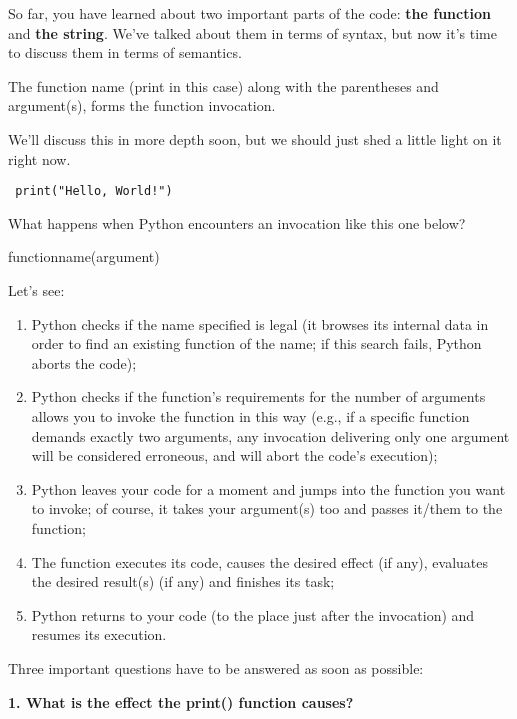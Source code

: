 \documentclass[a4paper,10pt]{article}
\begin{document}
So far, you have learned about two important parts of the code: \textbf{the function} and \textbf{the string}. We've talked about them in terms of syntax, but now it's time to discuss them in terms of semantics.
\newline

The function name (print in this case) along with the parentheses and argument(s), forms the function invocation.
\newline

We'll discuss this in more depth soon, but we should just shed a little light on it right now.
\begin{verbatim}
 print("Hello, World!")
\end{verbatim}

What happens when Python encounters an invocation like this one below?
\newline

{\selectfont function\underline{\hspace{.10in}}name(argument)}
\newline

Let's see:
\begin{enumerate}
 \item Python checks if the name specified is legal (it browses its internal data in order to find an existing function of the name; if this search fails, Python aborts the code);
 \item Python checks if the function's requirements for the number of arguments allows you to invoke the function in this way (e.g., if a specific function demands exactly two arguments, any invocation delivering only one argument will be considered erroneous, and will abort the code's execution);
 \item Python leaves your code for a moment and jumps into the function you want to invoke; of course, it takes your argument(s) too and passes it/them to the function;
 \item The function executes its code, causes the desired effect (if any), evaluates the desired result(s) (if any) and finishes its task;
 \item Python returns to your code (to the place just after the invocation) and resumes its execution.
\end{enumerate}

Three important questions have to be answered as soon as possible:
\newline

\textbf{1. What is the effect the {\selectfont print()} function causes?}
\newline
\end{document}
